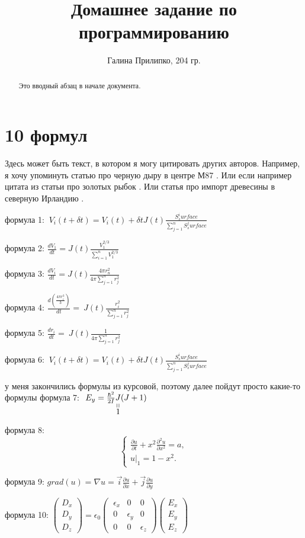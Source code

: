 \documentclass{article}
\title{Домашнее задание по программированию}
\author{Галина Прилипко, 204 гр.}
\def\stackbelow#1#2{\underset{\displaystyle\overset{\displaystyle\shortparallel}{#2}}{#1}}
\begin{document}
\maketitle
\begin{abstract}
  Это вводный абзац в начале документа.
\end{abstract}

\section{10 формул}

Здесь может быть текст, в котором я могу цитировать других авторов. Например, я хочу упоминуть статью про черную дыру в центре М87 \cite{M87}. Или если например цитата из статьи про золотых рыбок \cite{goldfish}.
Или статья про импорт древесины в северную Ирландию \cite{ancient}.

формула 1: 
$\ V_i(t+\delta t) = V_i(t)+\delta t J(t) \frac{S^i_surface}{\sum_{j=1}^{n} S^j_surface}$

формула 2: 
$\frac{d V_1}{d t} = J(t) \frac{V_1^{2/3}}{\sum_{i=1}^{n} V_1^{2/3}}$

формула 3: 
$\frac{dV_i}{dt}= J(t) \frac{4 \pi r_n^2}{4 \pi \sum_{j=1}^{n}{r_j^2}}$

формула 4: 
$\frac{d(\frac{4\pi r_i^3}{3})}{dt}=\ J(t)\frac{r_i^2}{\sum_{j=1}^{n}r_j^2}$

формула 5: 
$\frac{dr_i}{dt}=\ J(t)\frac{1}{4\pi\sum_{j=1}^{n}r_j^2}$

формула 6: 
$\ V_i(t+\delta t) = V_i(t)+\delta t J(t) \frac{S^i_surface}{\sum_{j=1}^{n} S^j_surface}$

у меня закончились формулы из курсовой, поэтому далее пойдут просто какие-то формулы
формула 7: 
$\ E_y = \frac{\hbar^2}{2 I} \stackbelow{J}{1} (J+1)$

формула 8: 
\begin{equation*}
 \begin{cases}
   \frac{\partial u}{\partial t} + x^2 \frac{\partial^2 u}{\partial x^2} = a, 
   \\
   u\Biggr|_{1} = 1 - x^2.
 \end{cases}
\end{equation*}

формула 9: 
$ grad(u) = \nabla u = \vec{i} \frac{\partial u}{\partial x} + \vec{j} \frac{\partial u}{\partial y}$

формула 10: 
$\begin{pmatrix}
  D_x\\
  D_y\\
  D_z
\end{pmatrix}
= \epsilon_0
\begin{pmatrix}
  \ \epsilon_x & 0 & 0\\
  \ 0 & \epsilon_y & 0\\
  \ 0& 0 & \epsilon_z
\end{pmatrix}
\begin{pmatrix}
  E_x\\
  E_y\\
  E_z
\end{pmatrix}$
\end{document}
